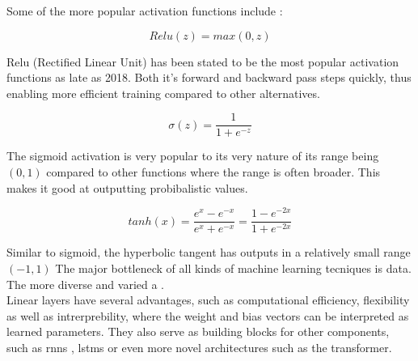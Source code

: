 Some of the more popular activation functions include \cite{szandala2021review}: 

\begin{equation}
    Relu(z) = max(0, z)
\end{equation}

Relu (Rectified Linear Unit) has been stated to be the most popular activation functions as late as 2018. Both it's forward and backward pass steps quickly, thus enabling more efficient training compared to other alternatives.

\begin{equation}
    \sigma(z) = \frac{1} {1 + e^{-z}}
\end{equation}

The sigmoid activation is very popular to its very nature of its range being $(0,1)$ compared to other functions where the range is often broader. This makes it good at outputting probibalistic values.

\begin{equation}
    tanh(x) = \frac{e^x - e^{-x}}{e^x + e^{-x}} = \frac{1 - e^{-2x}}{1 + e^{-2x}}
\end{equation}

Similar to sigmoid, the hyperbolic tangent has outputs in a relatively small range $(-1, 1)$
The major bottleneck of all kinds of machine learning tecniques is data. The more diverse and varied a . \\

Linear layers have several advantages, such as computational efficiency, flexibility as well as intrerprebility, where the weight and bias vectors can be interpreted as learned parameters. They also serve as building blocks for other components, such as \acrshort{rnn}s \cite{schmidt2019recurrent}, \acrshort{lstm}s \cite{lstm} or even more novel architectures such as the transformer\cite{vaswani2017attention}. \\ 

